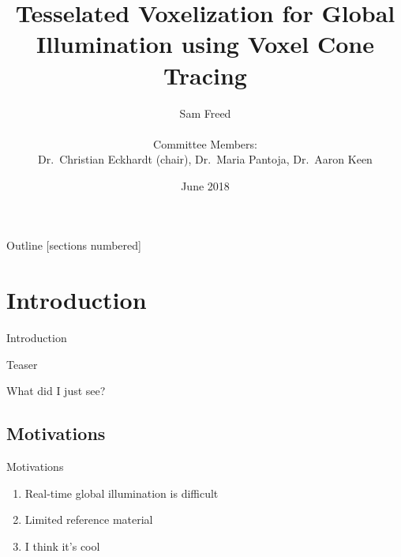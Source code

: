 \documentclass[10pt]{beamer}
\title{Tesselated Voxelization for Global Illumination using Voxel Cone Tracing}
\date{June 2018}
\author{Sam Freed\\\\Committee Members:\\ Dr.\ Christian Eckhardt (chair), Dr.\ Maria Pantoja, Dr.\ Aaron Keen\\}
\institute{California Polytechnic State University, San Luis Obispo}
\begin{document}
\frame{\titlepage}

\begin{frame}{Outline}
  [sections numbered]
  \tableofcontents[hideallsubsections]
\end{frame}


\section{Introduction}

\begin{frame}{Introduction}
\end{frame}

\begin{frame}{Teaser}
\end{frame}

\begin{frame}{What did I just see?}
\end{frame}

\subsection{Motivations}
\begin{frame}{Motivations}
  \begin{enumerate}
    \centering
    \item Real-time global illumination is difficult %
    \item Limited reference material %
    \pause
    \item I think it's cool %
  \end{enumerate}
\end{frame}
\end{document}
